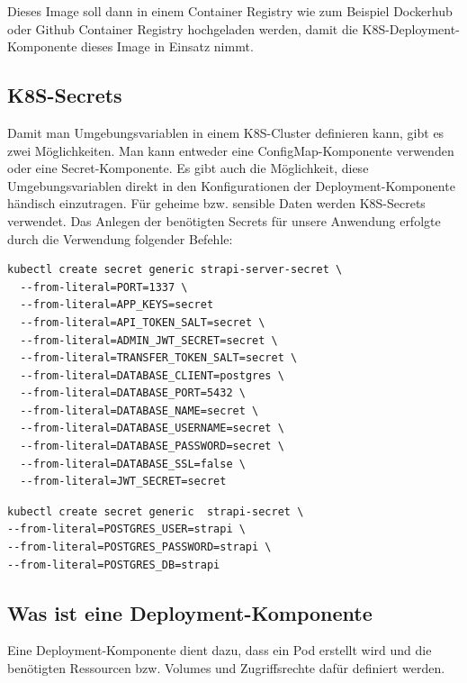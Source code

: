 Dieses Image soll dann in einem Container Registry wie zum Beispiel
Dockerhub oder Github Container Registry hochgeladen werden,
damit die K8S-Deployment-Komponente dieses Image in Einsatz nimmt.




\subsection{K8S-Secrets}
Damit man Umgebungsvariablen in einem K8S-Cluster definieren kann, gibt es zwei Möglichkeiten.
Man kann entweder eine ConfigMap-Komponente verwenden oder eine Secret-Komponente. Es gibt auch die Möglichkeit, diese Umgebungsvariablen direkt in den Konfigurationen der Deployment-Komponente händisch einzutragen.
Für geheime bzw. sensible Daten werden K8S-Secrets verwendet.
Das Anlegen der benötigten Secrets für unsere Anwendung erfolgte durch die Verwendung folgender Befehle:
\begin{lstlisting}[caption=Secrets für Strapi]
    kubectl create secret generic strapi-server-secret \
  --from-literal=PORT=1337 \  
  --from-literal=APP_KEYS=secret
  --from-literal=API_TOKEN_SALT=secret \
  --from-literal=ADMIN_JWT_SECRET=secret \
  --from-literal=TRANSFER_TOKEN_SALT=secret \
  --from-literal=DATABASE_CLIENT=postgres \
  --from-literal=DATABASE_PORT=5432 \
  --from-literal=DATABASE_NAME=secret \
  --from-literal=DATABASE_USERNAME=secret \
  --from-literal=DATABASE_PASSWORD=secret \
  --from-literal=DATABASE_SSL=false \
  --from-literal=JWT_SECRET=secret
\end{lstlisting}


\begin{lstlisting}[caption=Secrets für die Datenbank]
kubectl create secret generic  strapi-secret \
--from-literal=POSTGRES_USER=strapi \
--from-literal=POSTGRES_PASSWORD=strapi \
--from-literal=POSTGRES_DB=strapi
\end{lstlisting}








\subsection{Was ist eine Deployment-Komponente}

Eine Deployment-Komponente dient dazu, dass ein Pod erstellt wird und die benötigten Ressourcen bzw. Volumes und Zugriffsrechte
dafür definiert werden.\cite{k8s-deployment}

